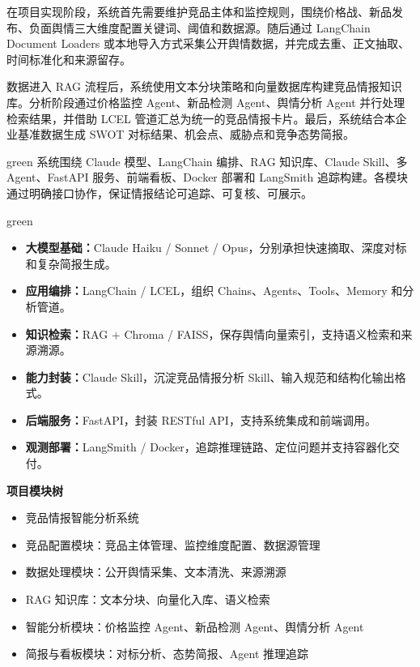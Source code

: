 \documentclass[UTF8,zihao=-4,a4paper]{ctexart}
\begin{document}
在项目实现阶段，系统首先需要维护竞品主体和监控规则，围绕价格战、新品发布、负面舆情三大维度配置关键词、阈值和数据源。随后通过 LangChain Document Loaders 或本地导入方式采集公开舆情数据，并完成去重、正文抽取、时间标准化和来源留存。

数据进入 RAG 流程后，系统使用文本分块策略和向量数据库构建竞品情报知识库。分析阶段通过价格监控 Agent、新品检测 Agent、舆情分析 Agent 并行处理检索结果，并借助 LCEL 管道汇总为统一的竞品情报卡片。最后，系统结合本企业基准数据生成 SWOT 对标结果、机会点、威胁点和竞争态势简报。

\begin{reportbox}[技术栈说明]{green}
系统围绕 Claude 模型、LangChain 编排、RAG 知识库、Claude Skill、多 Agent、FastAPI 服务、前端看板、Docker 部署和 LangSmith 追踪构建。各模块通过明确接口协作，保证情报结论可追踪、可复核、可展示。
\end{reportbox}

\begin{reportbox}[项目核心技术栈]{green}
\begin{itemize}
  \item \textbf{大模型基础：}Claude Haiku / Sonnet / Opus，分别承担快速摘取、深度对标和复杂简报生成。
  \item \textbf{应用编排：}LangChain / LCEL，组织 Chains、Agents、Tools、Memory 和分析管道。
  \item \textbf{知识检索：}RAG + Chroma / FAISS，保存舆情向量索引，支持语义检索和来源溯源。
  \item \textbf{能力封装：}Claude Skill，沉淀竞品情报分析 Skill、输入规范和结构化输出格式。
  \item \textbf{后端服务：}FastAPI，封装 RESTful API，支持系统集成和前端调用。
  \item \textbf{观测部署：}LangSmith / Docker，追踪推理链路、定位问题并支持容器化交付。
\end{itemize}
\end{reportbox}

\noindent\textbf{项目模块树}
\begin{itemize}
  \item 竞品情报智能分析系统
  \item 竞品配置模块：竞品主体管理、监控维度配置、数据源管理
  \item 数据处理模块：公开舆情采集、文本清洗、来源溯源
  \item RAG 知识库：文本分块、向量化入库、语义检索
  \item 智能分析模块：价格监控 Agent、新品检测 Agent、舆情分析 Agent
  \item 简报与看板模块：对标分析、态势简报、Agent 推理追踪
\end{itemize}
\end{document}
